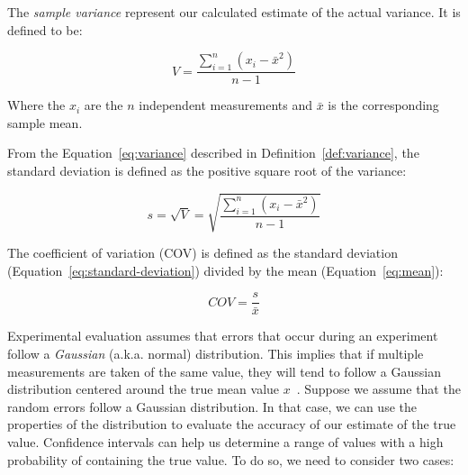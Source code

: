 \begin{definition}
 The \emph{sample variance}
represent our calculated estimate of the actual variance. It is defined to be:

\begin{equation}\label{eq:variance}
V = \frac{\sum_{i = 1}^n(x_i - \bar{x}^2)}{n - 1}
\end{equation}

\noindent Where the \(x_i\) are the \(n\) independent measurements and \(\bar{x}\) is
the corresponding sample mean.
\end{definition}

\begin{definition}
 From the Equation~\ref{eq:variance} described in Definition~\ref{def:variance}, the standard
deviation is defined as the positive square root of the variance:

\begin{equation}\label{eq:standard-deviation}
s = \sqrt{V} = \sqrt{\frac{\sum_{i = 1}^n(x_i - \bar{x}^2)}{n - 1}}
\end{equation}

\end{definition}

\begin{definition}
  The coefficient of variation (COV) is defined as the standard deviation (Equation~\ref{eq:standard-deviation}) divided by the mean (Equation~\ref{eq:mean}):

\begin{equation}\label{eq:cov}
  COV = \frac{s}{\bar{x}}
\end{equation}
\end{definition}


Experimental evaluation assumes that errors that occur during an experiment follow a \textit{Gaussian} (a.k.a. normal) distribution. This implies that if multiple measurements are taken of the same value, they will tend to follow a Gaussian distribution centered around the true mean value  \(x\)~\cite{lilja2005measuring}. Suppose we assume that the random errors follow a Gaussian distribution. In that case, we can use the properties of the distribution to evaluate the accuracy of our estimate of the true value. Confidence intervals can help us determine a range of values with a high probability of containing the true value. To do so, we need to consider two cases:

